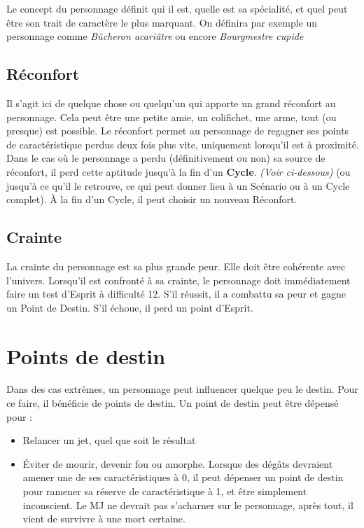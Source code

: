 \documentclass[a4paper,10pt,twoside,twocolumn,openany,bg=print]{dndbook}
\begin{document}
Le concept du personnage définit qui il est, quelle est sa spécialité, et quel peut être son trait de caractère le plus marquant. On définira par exemple un personnage comme \emph{Bûcheron acariâtre} ou encore \emph{Bourgmestre cupide}

\subsection*{Réconfort}

Il s'agit ici de quelque chose ou quelqu'un qui apporte un grand réconfort au personnage. Cela peut être une petite amie, un colifichet, une arme, tout (ou presque) est possible. Le réconfort permet au personnage de regagner ses points de caractéristique perdus deux fois plus vite, uniquement lorsqu'il est à proximité. Dans le cas où le personnage a perdu (définitivement ou non) sa source de réconfort, il perd cette aptitude jusqu'à la fin d'un \textbf{Cycle}. \emph{(Voir ci-dessous)} (ou jusqu'à ce qu'il le retrouve, ce qui peut donner lieu à un Scénario ou à un Cycle complet). À la fin d'un Cycle, il peut choisir un nouveau Réconfort.

\subsection*{Crainte}

La crainte du personnage est sa plus grande peur. Elle doit être cohérente avec l'univers. Lorsqu'il est confronté à sa crainte, le personnage doit immédiatement faire un test d'Esprit à difficulté 12. S'il réussit, il a combattu sa peur et gagne un Point de Destin. S'il échoue, il perd un point d'Esprit.

\section{Points de destin}

Dans des cas extrêmes, un personnage peut influencer quelque peu le destin. Pour ce faire, il bénéficie de points de destin. Un point de destin peut être dépensé pour :

\begin{itemize}
	\item Relancer un jet, quel que soit le résultat
	\item Éviter de mourir, devenir fou ou amorphe. Lorsque des dégâts devraient amener une de ses caractéristiques à 0, il peut dépenser un point de destin pour ramener sa réserve de caractéristique à 1, et être simplement inconscient. Le MJ ne devrait pas s'acharner sur le personnage, après tout, il vient de survivre à une mort certaine.
\end{itemize}
\end{document}

